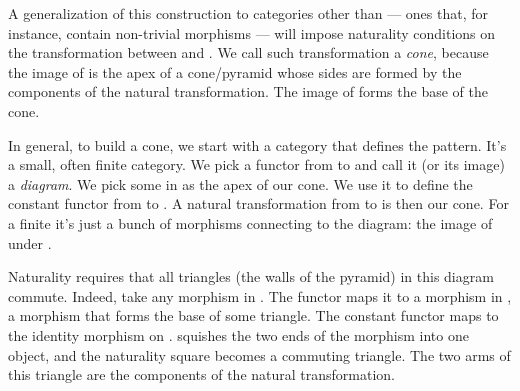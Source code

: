 A generalization of this construction to categories other than
 --- ones that, for instance, contain non-trivial morphisms
--- will impose naturality conditions on the transformation between
 and . We call such transformation a \emph{cone},
because the image of \mathtext{\Delta} is the apex of a cone/pyramid whose sides are
formed by the components of the natural transformation. The image of 
forms the base of the cone.

In general, to build a cone, we start with a category  that
defines the pattern. It's a small, often finite category. We pick a
functor  from  to  and call it (or its image) a
\emph{diagram}. We pick some  in  as the apex of our
cone. We use it to define the constant functor  from
 to . A natural transformation from 
to  is then our cone. For a finite  it's just a bunch of
morphisms connecting  to the diagram: the image of 
under .

\begin{figure}[H]
    \centering
\end{figure}

Naturality requires that all triangles (the walls of the pyramid) in
this diagram commute. Indeed, take any morphism  in .
The functor  maps it to a morphism  in , a
morphism that forms the base of some triangle. The constant functor
 maps  to the identity morphism on
. \mathtext{\Delta} squishes the two ends of the morphism into one object, and
the naturality square becomes a commuting triangle. The two arms of this
triangle are the components of the natural transformation.

\begin{figure}[H]
    \centering
\end{figure}

